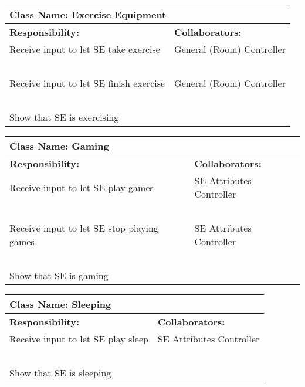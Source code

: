\documentclass[]{article}
\begin{document}
\begin{table}[H]
    \centering
    \begin{tabular}{|p{5cm}|p{5cm}|}
        \hline
        \multicolumn{2}{|l|}{\textbf{Class Name:} Exercise Equipment}\\
        \hline
        \textbf{Responsibility:} & \textbf{Collaborators:}\\
        \hline
        Receive input to let SE take exercise & General (Room) Controller\\
        ~ & ~\\
        Receive input to let SE finish exercise & General (Room) Controller\\
        ~ & ~\\
        Show that SE is exercising & ~\\
        \hline
    \end{tabular}
\end{table}

\begin{table}[H]
    \centering
    \begin{tabular}{|p{5cm}|p{5cm}|}
        \hline
        \multicolumn{2}{|l|}{\textbf{Class Name:} Gaming}\\
        \hline
        \textbf{Responsibility:} & \textbf{Collaborators:}\\
        \hline
        Receive input to let SE play games & SE Attributes Controller\\
        ~ & ~\\
        Receive input to let SE stop playing games & SE Attributes Controller\\
        ~ & ~\\
        Show that SE is gaming & ~\\
        \hline
    \end{tabular}
\end{table}

\begin{table}[H]
    \centering
    \begin{tabular}{|p{5cm}|p{5cm}|}
        \hline
        \multicolumn{2}{|l|}{\textbf{Class Name:} Sleeping}\\
        \hline
        \textbf{Responsibility:} & \textbf{Collaborators:}\\
        \hline
        Receive input to let SE play sleep & SE Attributes Controller\\
        ~ & ~\\
        Show that SE is sleeping & ~\\
        \hline
    \end{tabular}
\end{table}
\end{document}
